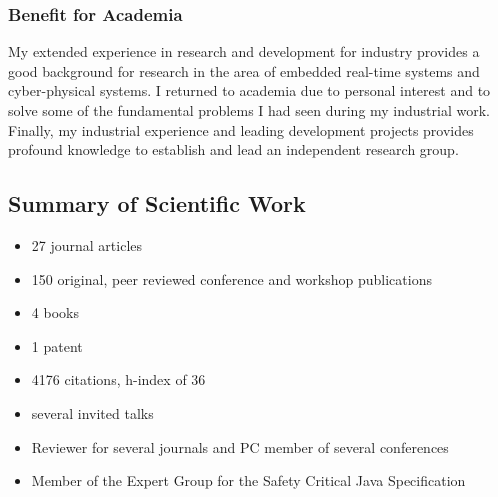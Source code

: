 \documentclass[%
    a4paper,
    11pt, %
    headinclude, footexclude,
    notitlepage,
    headsepline,
    pointlessnumbers,
    ]{scrartcl}
\begin{document}
%
%

\subsubsection*{Benefit for Academia}

My extended experience in research and development for industry
provides a good background for research in the area of 
embedded real-time systems and
cyber-physical systems.
I returned to academia due to personal interest
and to solve some of the fundamental problems I had seen during my
industrial work. Finally, my industrial experience and leading
development projects provides profound knowledge to establish and
lead an independent research group.


\subsection*{Summary of Scientific Work}

\begin{itemize}
  \item 27 journal articles
  \item 150 original, peer reviewed conference and workshop
      publications
  \item 4 books
  \item 1 patent
  \item 4176 citations, h-index of 36
  \item several invited talks %
  \item Reviewer for several journals and PC member of several
      conferences
  \item Member of the Expert Group for the Safety Critical Java
      Specification
\end{itemize}
\end{document}
